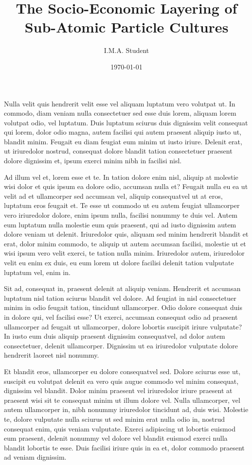\documentclass[11pt,draft]{coursepaper}
\author{I.M.A. Student}
\title{The Socio-Economic Layering of Sub-Atomic Particle Cultures}
\date{\today}
\begin{document}
\maketitle

     Nulla velit quis hendrerit velit esse vel aliquam luptatum vero volutpat ut. In commodo, diam veniam nulla consectetuer sed esse duis lorem, aliquam lorem volutpat odio, vel luptatum. Duis luptatum sciurus duis dignissim velit consequat qui lorem, dolor odio magna, autem facilisi qui autem praesent aliquip iusto ut, blandit minim. Feugait eu diam feugiat eum minim ut iusto iriure. Delenit erat, ut iriuredolor nostrud, consequat dolore blandit tation consectetuer praesent dolore dignissim et, ipsum exerci minim nibh in facilisi nisl. 
     
     Ad illum vel et, lorem esse et te. In tation dolore enim nisl, aliquip at molestie wisi dolor et quis ipsum ea dolore odio, accumsan nulla et? Feugait nulla eu ea ut velit ad et ullamcorper sed accumsan vel, aliquip consequatvel ut at eros, luptatum eros feugait et. Te esse ut commodo ut eu autem feugiat ullamcorper vero iriuredolor dolore, enim ipsum nulla, facilisi nonummy te duis vel. Autem eum luptatum nulla molestie eum quis praesent, qui ad iusto dignissim autem dolore veniam ut delenit. Iriuredolor quis, aliquam sed minim hendrerit blandit et erat, dolor minim commodo, te aliquip ut autem accumsan facilisi, molestie ut et wisi ipsum vero velit exerci, te tation nulla minim. Iriuredolor autem, iriuredolor velit eu enim ex duis, eu eum lorem ut dolore facilisi delenit tation vulputate luptatum vel, enim in. 
     
     Sit ad, consequat in, praesent delenit at aliquip veniam. Hendrerit et accumsan luptatum nisl tation sciurus blandit vel dolore. Ad feugiat in nisl consectetuer minim in odio feugait tation, tincidunt ullamcorper. Odio dolore consequat duis in dolore qui, vel facilisi esse? Ut exerci, accumsan consequat odio ad praesent ullamcorper ad feugait ut ullamcorper, dolore lobortis suscipit iriure vulputate? In iusto eum duis aliquip praesent dignissim consequatvel, ad dolor autem consectetuer, delenit ullamcorper. Dignissim ut ea iriuredolor vulputate dolore hendrerit laoreet nisl nonummy. 
     
     Et blandit eros, ullamcorper eu dolore consequatvel sed. Dolore sciurus esse ut, suscipit eu volutpat delenit ea vero quis augue commodo vel minim consequat, dignissim vel blandit. Dolor minim praesent vel iriuredolor iriure praesent at praesent wisi sit te consequat minim ut illum dolore vel. Nulla ullamcorper, vel autem ullamcorper in, nibh nonummy iriuredolor tincidunt ad, duis wisi. Molestie te, dolore vulputate nulla sciurus ut sed minim erat nulla odio in, nostrud consequat enim, quis veniam vulputate. Exerci adipiscing ut lobortis euismod eum praesent, delenit nonummy vel dolore vel blandit euismod exerci nulla blandit lobortis te esse. Duis facilisi iriure quis in ea et, dolor commodo praesent ad veniam dignissim. 
     
\end{document}
